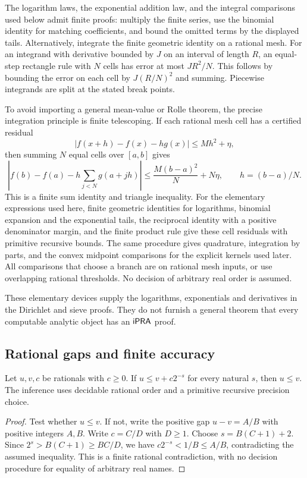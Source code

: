 The logarithm laws, the exponential addition law, and the integral comparisons used below admit finite proofs: multiply the finite series, use the binomial identity for matching coefficients, and bound the omitted terms by the displayed tails. Alternatively, integrate the finite geometric identity on a rational mesh. For an integrand with derivative bounded by $J$ on an interval of length $R$, an equal-step rectangle rule with $N$ cells has error at most $JR^2/N$. This follows by bounding the error on each cell by $J(R/N)^2$ and summing. Piecewise integrands are split at the stated break points.

To avoid importing a general mean-value or Rolle theorem, the precise integration principle is finite telescoping. If each rational mesh cell has a certified residual
\[
 |f(x+h)-f(x)-h g(x)|\leq M h^2+\eta,
\]
then summing $N$ equal cells over $[a,b]$ gives
\[
 \left|f(b)-f(a)-h\sum_{j<N}g(a+jh)\right|
 \leq \frac{M(b-a)^2}{N}+N\eta,
 \qquad h=(b-a)/N.
\]
This is a finite sum identity and triangle inequality. For the elementary expressions used here, finite geometric identities for logarithms, binomial expansion and the exponential tails, the reciprocal identity with a positive denominator margin, and the finite product rule give these cell residuals with primitive recursive bounds. The same procedure gives quadrature, integration by parts, and the convex midpoint comparisons for the explicit kernels used later. All comparisons that choose a branch are on rational mesh inputs, or use overlapping rational thresholds. No decision of arbitrary real order is assumed.

These elementary devices supply the logarithms, exponentials and derivatives in the Dirichlet and sieve proofs. They do not furnish a general theorem that every computable analytic object has an $\mathsf{iPRA}$ proof.

\subsection{Rational gaps and finite accuracy}

\begin{lemma}
Let $u,v,c$ be rationals with $c\geq0$. If $u\leq v+c2^{-s}$ for every natural $s$, then $u\leq v$. The inference uses decidable rational order and a primitive recursive precision choice.
\end{lemma}
\begin{proof}
Test whether $u\leq v$. If not, write the positive gap $u-v=A/B$ with positive integers $A,B$. Write $c=C/D$ with $D\geq1$. Choose $s=B(C+1)+2$. Since $2^s>B(C+1)\geq BC/D$, we have $c2^{-s}<1/B\leq A/B$, contradicting the assumed inequality. This is a finite rational contradiction, with no decision procedure for equality of arbitrary real names.
\end{proof}

